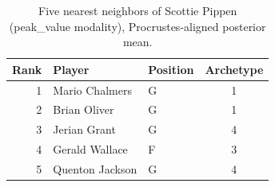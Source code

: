 \begin{table}[htbp]
  \centering\small
  \begin{tabular}{rllc}
    \toprule
    Rank & Player & Position & Archetype \\
    \midrule
    1 & Mario Chalmers & G & 1 \\
    2 & Brian Oliver & G & 1 \\
    3 & Jerian Grant & G & 4 \\
    4 & Gerald Wallace & F & 3 \\
    5 & Quenton Jackson & G & 4 \\
    \bottomrule
  \end{tabular}
  \caption{Five nearest neighbors of Scottie Pippen (peak_value modality), Procrustes-aligned posterior mean.}
  \label{tab:Scottie_Pippen_neighbors_peak_value}
\end{table}

